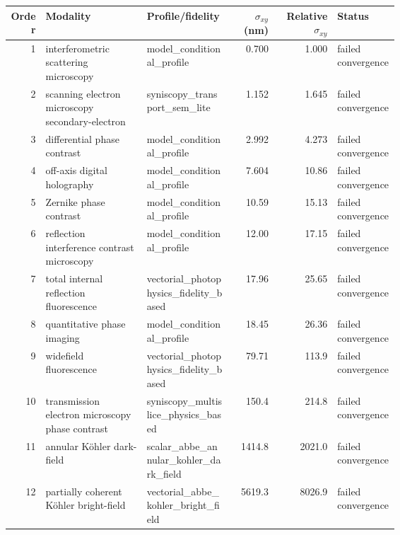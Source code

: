 \begin{tabular}{r p{0.26\linewidth} p{0.22\linewidth} r r p{0.16\linewidth}}
\toprule
Order & Modality & Profile/fidelity & $\sigma_{xy}$ (nm) & Relative $\sigma_{xy}$ & Status \\
\midrule
1 & interfero\allowbreak{}metric scattering microscopy & model\_conditional\_profile & 0.700 & 1.000 & failed convergence \\
2 & scanning electron microscopy secondary-electron & syniscopy\_transport\_sem\_lite & 1.152 & 1.645 & failed convergence \\
3 & differential phase contrast & model\_conditional\_profile & 2.992 & 4.273 & failed convergence \\
4 & off-axis digital holography & model\_conditional\_profile & 7.604 & 10.86 & failed convergence \\
5 & Zernike phase contrast & model\_conditional\_profile & 10.59 & 15.13 & failed convergence \\
6 & reflection interference contrast microscopy & model\_conditional\_profile & 12.00 & 17.15 & failed convergence \\
7 & total internal reflection fluorescence & vectorial\_photophysics\_fidelity\_based & 17.96 & 25.65 & failed convergence \\
8 & quantitative phase imaging & model\_conditional\_profile & 18.45 & 26.36 & failed convergence \\
9 & widefield fluorescence & vectorial\_photophysics\_fidelity\_based & 79.71 & 113.9 & failed convergence \\
10 & transmission electron microscopy phase contrast & syniscopy\_multislice\_physics\_based & 150.4 & 214.8 & failed convergence \\
11 & annular Köhler dark-field & scalar\_abbe\_annular\_kohler\_dark\_field & 1414.8 & 2021.0 & failed convergence \\
12 & partially coherent Köhler bright-field & vectorial\_abbe\_kohler\_bright\_field & 5619.3 & 8026.9 & failed convergence \\
\bottomrule
\end{tabular}
